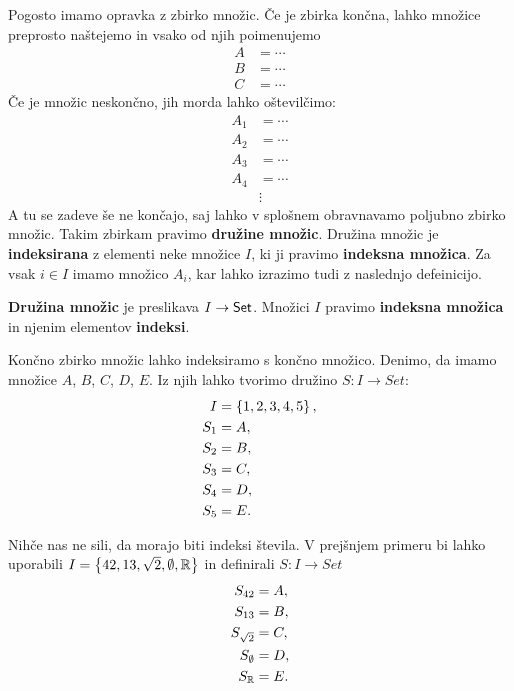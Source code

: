 Pogosto imamo opravka z zbirko množic. Če je zbirka končna, lahko množice preprosto
naštejemo in vsako od njih poimenujemo
%
\begin{align*}
    A &= \cdots \\
    B &= \cdots \\
    C &= \cdots
\end{align*}
%
Če je množic neskončno, jih morda lahko oštevilčimo:
%
\begin{align*}
    A_1 &= \cdots \\
    A_2 &= \cdots \\
    A_3 &= \cdots \\
    A_4 &= \cdots \\
        &\vdots
\end{align*}
%
A tu se zadeve še ne končajo, saj lahko v splošnem obravnavamo poljubno zbirko množic.
Takim zbirkam pravimo \textbf{družine množic}. Družina množic je \textbf{indeksirana} z elementi neke množice $I$, ki ji pravimo \textbf{indeksna množica}. Za vsak $i \in I$ imamo množico $A_i$,  kar lahko izrazimo tudi z naslednjo defeinicijo.

\begin{definicija}
  \textbf{Družina množic} je preslikava $I \to \mathsf{Set}$. Množici $I$ pravimo \textbf{indeksna množica} in njenim elementov \textbf{indeksi}.
\end{definicija}


\begin{primer}
  Končno zbirko množic lahko indeksiramo s končno množico. Denimo, da imamo
  množice $A$, $B$, $C$, $D$, $E$. Iz njih lahko tvorimo družino $S : I \to Set$:
  \begin{align*}
  I &= \left\{1, 2, 3, 4, 5\right\}, \\
  S_1 &= A,\\
  S_2 &= B,\\
  S_3 &= C,\\
  S_4 &= D,\\
  S_5 &= E.
  \end{align*}
\end{primer}

\begin{primer}
  Nihče nas ne sili, da morajo biti indeksi števila. V prejšnjem primeru bi lahko
  uporabili $I = \left\{42, 13, \sqrt{2}, \emptyset, \mathbb{R}\right\}$ in definirali $S : I \to Set$
  \begin{align*}
  S_{42} &= A,\\
  S_{13} &= B,\\
  S_{\sqrt{2}} &= C,\\
  S_{\emptyset} &= D,\\
  S_{\mathbb{R}} &= E.
  \end{align*}
\end{primer}


